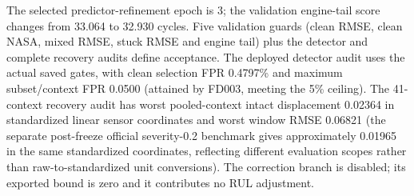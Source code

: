 The selected predictor-refinement epoch is 3; the validation engine-tail score changes from 33.064 to 32.930 cycles. Five validation guards (clean RMSE, clean NASA, mixed RMSE, stuck RMSE and engine tail) plus the detector and complete recovery audits define acceptance. The deployed detector audit uses the actual saved gates, with clean selection FPR 0.4797\% and maximum subset/context FPR 0.0500 (attained by FD003, meeting the 5\% ceiling). The 41-context recovery audit has worst pooled-context intact displacement 0.02364 in standardized linear sensor coordinates and worst window RMSE 0.06821 (the separate post-freeze official severity-0.2 benchmark gives approximately 0.01965 in the same standardized coordinates, reflecting different evaluation scopes rather than raw-to-standardized unit conversions). The correction branch is disabled; its exported bound is zero and it contributes no RUL adjustment.
